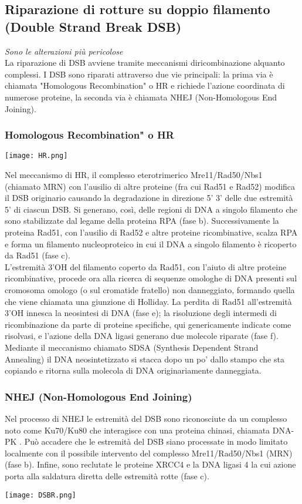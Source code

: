 \documentclass{article}
\begin{document}
\subsection{Riparazione di rotture su doppio filamento (Double Strand Break DSB)}
\textit{Sono le alterazioni più pericolose}\\
La riparazione di DSB avviene tramite meccanismi diricombinazione alquanto complessi.
I DSB sono riparati attraverso due vie principali: la prima via è chiamata "Homologous Recombination" o HR e richiede l'azione coordinata di numerose proteine, la seconda via è chiamata NHEJ (Non-Homologous End Joining).
\subsubsection{Homologous Recombination" o HR}
\begin{center}
    \texttt{[image: HR.png]}
\end{center}
Nel meccanismo di HR, il complesso eterotrimerico Mre11/Rad50/Nbs1 (chiamato MRN) con l'ausilio di altre proteine
(fra cui Rad51 e Rad52) modifica il DSB originario causando la degradazione in direzione 5' 3' delle due estremità 5' di ciascun DSB.
Si generano, così, delle regioni di DNA a singolo filamento che sono stabilizzate dal legame della proteina RPA (fase b).
Successivamente la proteina Rad51, con l'ausilio di Rad52 e altre proteine ricombinative, scalza RPA e forma un filamento
nucleoproteico in cui il DNA a singolo filamento è ricoperto da Rad51 (fase c).\\
L'estremità 3'OH del filamento coperto da Rad51, con l'aiuto di altre proteine ricombinative, procede ora alla ricerca di sequenze
omologhe di DNA presenti sul cromosoma omologo (o sul cromatide fratello) non danneggiato, formando quella che viene chiamata una giunzione di Holliday.
La perdita di Rad51 all'estremità 3'OH innesca la neosintesi di DNA (fase e); la risoluzione degli intermedi di ricombinazione da parte di proteine
specifiche, qui genericamente indicate come risolvasi, e l'azione della DNA ligasi generano due molecole riparate (fase f). Mediante il meccanismo chiamato SDSA (Synthesis Dependent Strand Annealing) il DNA
neosintetizzato si stacca dopo un po' dallo stampo che sta copiando e ritorna sulla molecola di DNA originariamente danneggiata.
\subsubsection{NHEJ (Non-Homologous End Joining)}Nel processo di NHEJ le estremità del DSB sono riconosciute da
un complesso noto come Ku70/Ku80 che interagisce con una proteina chinasi, chiamata DNA-PK .
Può accadere che le estremità del DSB siano processate in modo limitato localmente con il possibile intervento del complesso Mre11/Rad50/Nbs1 (MRN) (fase b).
Infine, sono reclutate le proteine XRCC4 e la DNA ligasi 4 la cui azione porta alla saldatura diretta delle estremità rotte (fase c).
\begin{center}
    \texttt{[image: DSBR.png]}
\end{center}
\end{document}
